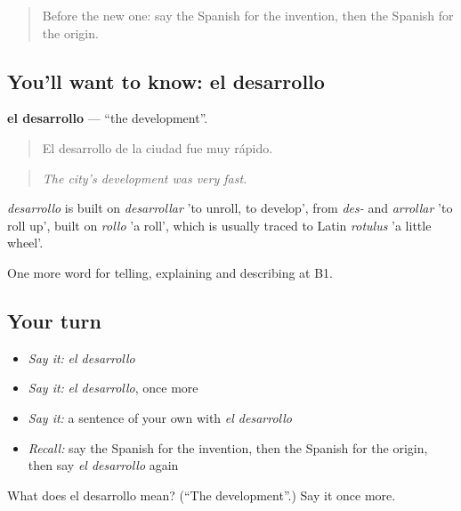 \label{lesson:ES-C571-desarrollo}



\begin{quote}
Before the new one: say the Spanish for the invention, then the Spanish for the origin.
\end{quote}

\subsection*{You'll want to know: el desarrollo}
\textbf{el desarrollo} — \textquotedblleft{}the development\textquotedblright{}.

\begin{quote}
El desarrollo de la ciudad fue muy rápido.
\end{quote}

\begin{quote}
\emph{The city's development was very fast.}
\end{quote}

\begin{cousinweb}
\emph{desarrollo} is built on \emph{desarrollar} 'to unroll, to develop', from \emph{des-} and \emph{arrollar} 'to roll up', built on \emph{rollo} 'a roll', which is usually traced to Latin \emph{rotulus} 'a little wheel'.
\end{cousinweb}

\begin{grammarlens}[title={What you've built}]
One more word for telling, explaining and describing at B1.
\end{grammarlens}

\subsection*{Your turn}
\begin{itemize}
\raggedright
  \item \emph{Say it:} \emph{el desarrollo}
  \item \emph{Say it:} \emph{el desarrollo}, once more
  \item \emph{Say it:} a sentence of your own with \emph{el desarrollo}
  \item \emph{Recall:} say the Spanish for the invention, then the Spanish for the origin, then say \emph{el desarrollo} again
\end{itemize}

\begin{tcolorbox}[breakable,colback=teal!4,colframe=teal!35!black,title={Before you move on}]
What does el desarrollo mean? (\textquotedblleft{}The development\textquotedblright{}.) Say it once more.
\end{tcolorbox}
